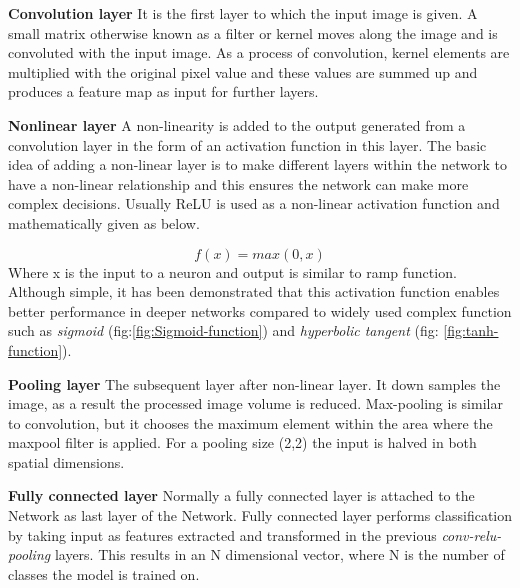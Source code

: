 \newpara \textbf{Convolution layer} It is the first layer to which the input image is given. A small matrix otherwise known as a filter or kernel moves along the image and is convoluted with the input image. As a process of convolution, kernel elements are multiplied with the original pixel value and these values are summed up and produces a feature map as input for further layers.
 
\newpara \textbf{Nonlinear layer}
A non-linearity is added to the output generated from a convolution layer in the form of an activation function in this layer. The basic idea of adding a non-linear layer is to make different layers within the network to have a non-linear relationship and this ensures the network can make more complex decisions.
Usually ReLU is used as a non-linear activation function and mathematically given as below.

\begin{equation}
	f(x) =max(0, x)
\end {equation}
Where x is the input to a neuron and output is similar to ramp function.
Although simple, it has been demonstrated that this activation function enables better performance in deeper networks compared to widely used complex function such as \textit{sigmoid} (fig:\ref{fig:Sigmoid-function}) and \textit{hyperbolic tangent} (fig: \ref{fig:tanh-function}).

\newpara \textbf{Pooling layer}
The subsequent layer after non-linear layer. It down samples the image, as a result the processed image volume is reduced. Max-pooling is similar to convolution, but it chooses the maximum element within the area where the maxpool filter is applied. For a pooling size (2,2) the input is halved in both spatial dimensions.

\newpara \textbf{Fully connected layer}
Normally a fully connected layer is attached to the Network as last layer of the Network. Fully connected layer performs classification by taking input as features extracted and transformed in the previous \textit{conv-relu-pooling} layers. This results in an N dimensional vector, where N is the number of classes the model is trained on.

